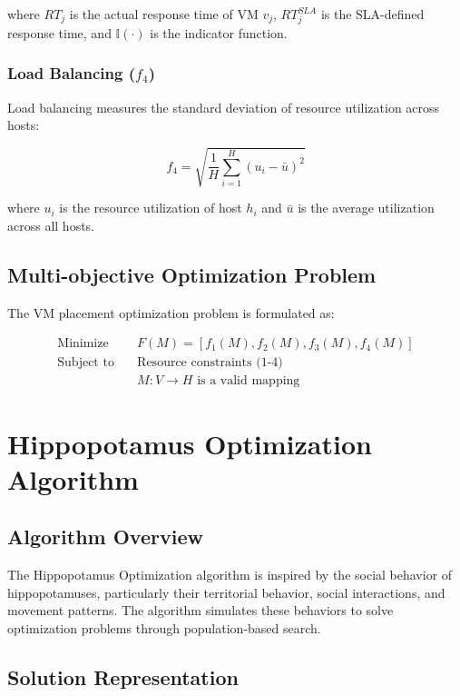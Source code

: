 \documentclass[conference]{IEEEtran}
\begin{document}
where $RT_j$ is the actual response time of VM $v_j$, $RT_j^{SLA}$ is the SLA-defined response time, and $\mathbb{I}(\cdot)$ is the indicator function.

\subsubsection{Load Balancing ($f_4$)}

Load balancing measures the standard deviation of resource utilization across hosts:

\begin{equation}
f_4 = \sqrt{\frac{1}{H} \sum_{i=1}^{H} (u_i - \bar{u})^2}
\end{equation}

where $u_i$ is the resource utilization of host $h_i$ and $\bar{u}$ is the average utilization across all hosts.

\subsection{Multi-objective Optimization Problem}

The VM placement optimization problem is formulated as:

\begin{align}
\text{Minimize} \quad & F(M) = [f_1(M), f_2(M), f_3(M), f_4(M)] \\
\text{Subject to} \quad & \text{Resource constraints (1-4)} \\
& M: V \rightarrow H \text{ is a valid mapping}
\end{align}

\section{Hippopotamus Optimization Algorithm}

\subsection{Algorithm Overview}

The Hippopotamus Optimization algorithm is inspired by the social behavior of hippopotamuses, particularly their territorial behavior, social interactions, and movement patterns. The algorithm simulates these behaviors to solve optimization problems through population-based search.

\subsection{Solution Representation}
\end{document}
